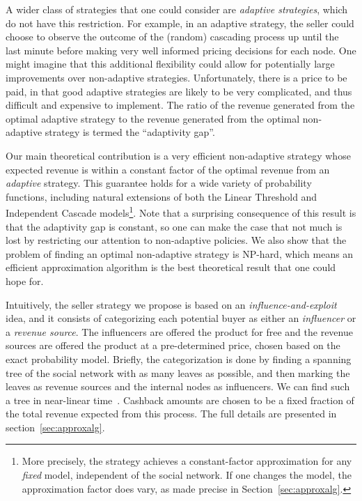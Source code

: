 \documentclass[letterpaper,twoside]{article}
\begin{document}
A wider class of strategies that one could consider are
{\em adaptive strategies}, which do not have this restriction. For example, in an
adaptive strategy, the seller could choose to observe the outcome of the (random)
cascading process up until the last minute before making very well informed
pricing decisions for each node. One might imagine that this additional flexibility
could allow for potentially large improvements over non-adaptive strategies.
Unfortunately, there is a price to be paid, in that good adaptive strategies are likely
to be very complicated, and thus difficult and expensive to implement. The ratio of
the revenue generated from the optimal adaptive strategy to the revenue generated
from the optimal non-adaptive strategy is termed the ``adaptivity gap''.

Our main theoretical contribution is a very efficient non-adaptive strategy whose expected revenue is
within a constant factor of the optimal revenue from an {\em adaptive} strategy. This
guarantee holds for a wide variety of probability functions, including natural extensions
of both the Linear Threshold and Independent Cascade models\footnote{More precisely, the
strategy achieves a constant-factor approximation for any {\em fixed} model, independent
of the social network. If one changes the model, the approximation factor does vary, as
made precise in Section~\ref{sec:approxalg}.}. Note that a surprising consequence of this result
is that the adaptivity gap is constant, so one can make the case that not much is lost by
restricting our attention to non-adaptive policies. We also show that the problem of
finding an optimal non-adaptive strategy is NP-hard, which means an efficient
approximation algorithm is the best theoretical result that one could hope for.

Intuitively, the seller strategy we propose is based on an {\em influence-and-exploit} idea,
and it consists of categorizing each potential buyer as either an {\em influencer} or a
{\em revenue source}. The influencers are offered the product for free and the revenue
sources are offered the product at a pre-determined price, chosen based on the exact
probability model. Briefly, the categorization is done by finding a spanning tree of
the social network with as many leaves as possible, and then marking the leaves as
revenue sources and the internal nodes as influencers. We can find such a tree
in near-linear time~\cite{KW91,LR98}. Cashback amounts are chosen to be a fixed fraction of
the total revenue expected from this process. The full details are presented in
section~\ref{sec:approxalg}.
\end{document}
